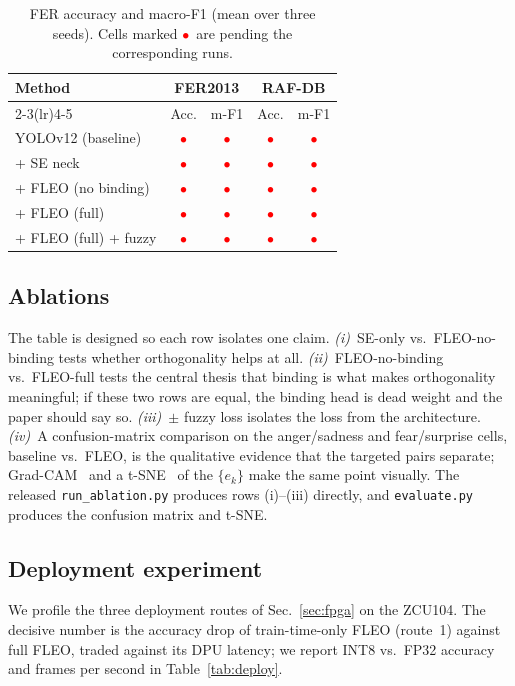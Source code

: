 \documentclass[journal]{IEEEtran}
\newcommand{\pending}{\textcolor{red}{$\bullet$}}
\begin{document}
\begin{table}[t]
\caption{FER accuracy and macro-F1 (mean over three seeds). Cells marked
\pending\ are pending the corresponding runs.}
\label{tab:main}
\centering
\begin{tabular}{lcccc}
\toprule
\multirow{2}{*}{Method} & \multicolumn{2}{c}{FER2013} &
\multicolumn{2}{c}{RAF-DB}\\
\cmidrule(lr){2-3}\cmidrule(lr){4-5}
 & Acc. & m-F1 & Acc. & m-F1 \\
\midrule
YOLOv12 (baseline)          & \pending & \pending & \pending & \pending \\
\quad + SE neck             & \pending & \pending & \pending & \pending \\
\quad + FLEO (no binding)   & \pending & \pending & \pending & \pending \\
\quad + FLEO (full)         & \pending & \pending & \pending & \pending \\
\quad + FLEO (full) + fuzzy & \pending & \pending & \pending & \pending \\
\bottomrule
\end{tabular}
\end{table}

\subsection{Ablations}
The table is designed so each row isolates one claim.
\emph{(i)}~SE-only vs.\ FLEO-no-binding tests whether orthogonality helps at
all. \emph{(ii)}~FLEO-no-binding vs.\ FLEO-full tests the central thesis that
binding is what makes orthogonality meaningful; if these two rows are equal,
the binding head is dead weight and the paper should say so.
\emph{(iii)}~$\pm$ fuzzy loss isolates the loss from the architecture.
\emph{(iv)}~A confusion-matrix comparison on the anger/sadness and
fear/surprise cells, baseline vs.\ FLEO, is the qualitative evidence that the
targeted pairs separate; Grad-CAM~\cite{selvaraju2017gradcam} and a
t-SNE~\cite{maaten2008tsne} of the $\{e_k\}$ make the same point visually. The
released \texttt{run\_ablation.py} produces rows (i)--(iii) directly, and
\texttt{evaluate.py} produces the confusion matrix and t-SNE.

\subsection{Deployment experiment}
We profile the three deployment routes of Sec.~\ref{sec:fpga} on the ZCU104.
The decisive number is the accuracy drop of train-time-only FLEO (route~1)
against full FLEO, traded against its DPU latency; we report INT8 vs.\ FP32
accuracy and frames per second in Table~\ref{tab:deploy}.
\end{document}
